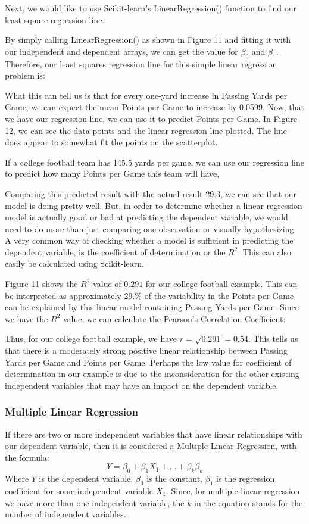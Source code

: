 \documentclass[a4paper,12pt]{report}
\begin{document}
Next, we would like to use Scikit-learn’s LinearRegression() function to find our least square regression line.

By simply calling LinearRegression() as shown in Figure 11 and fitting it with our independent and dependent arrays, we can get the value for $\beta_0$ and $\beta_1$. Therefore, our least squares regression line for this simple linear regression problem is:

What this can tell us is that for every one-yard increase in Passing Yards per Game, we can expect the mean Points per Game to increase by 0.0599. Now, that we have our regression line, we can use it to predict Points per Game. In Figure 12, we can see the data points and the linear regression line plotted. The line does appear to somewhat fit the points on the scatterplot. 

If a college football team has 145.5 yards per game, we can use our regression line to predict how many Points per Game this team will have, 


Comparing this predicted result with the actual result 29.3, we can see that our model is doing pretty well. But, in order to determine whether a linear regression model is actually good or bad at predicting the dependent variable, we would need to do more than just comparing one observation or visually hypothesizing. A very common way of checking whether a model is sufficient in predicting the dependent variable, is the coefficient of determination or the $R^2$. This can also easily be calculated using Scikit-learn. 


Figure 11 shows the $R^2$ value of $0.291$ for our college football example. This can be interpreted as approximately 29.\% of the variability in the Points per Game can be explained by this linear model containing Passing Yards per Game. Since we have the $R^2$ value, we can calculate the Pearson’s Correlation Coefficient:

Thus, for our college football example, we have $r=\sqrt{0.291}=0.54$. This tells us that there is a moderately strong positive linear relationship between Passing Yards per Game and Points per Game. Perhaps the low value for coefficient of determination in our example is due to the inconsideration for the other existing independent variables that may have an impact on the dependent variable. 


\subsubsection{Multiple Linear Regression}
If there are two or more independent variables that have linear relationships with our dependent variable, then it is considered a Multiple Linear Regression, with the formula:
$$Y=\beta_0+\beta_1X_1+...+\beta_k\beta_k$$
Where $Y$ is the dependent variable, $\beta_0$ is the constant, $\beta_1$ is the regression coefficient for some independent variable $X_1$. Since, for multiple linear regression we have more than one independent variable, the $k$ in the equation stands for the number of independent variables.
\end{document}

